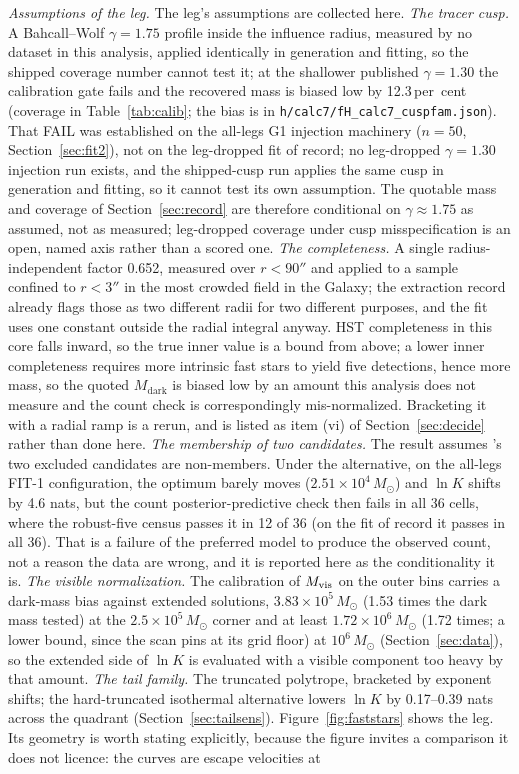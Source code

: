 \documentclass[11pt]{article}
\newcommand{\msun}{\ensuremath{M_\odot}}
\newcommand{\mdark}{\ensuremath{M_{\mathrm{dark}}}}
\newcommand{\lnK}{\ensuremath{\ln K}}
\begin{document}
\emph{Assumptions of the leg.} The leg's assumptions are collected here. \emph{The tracer cusp.} A Bahcall--Wolf $\gamma = 1.75$ profile inside the influence radius, measured by no dataset in this analysis, applied identically in generation and fitting, so the shipped coverage number cannot test it; at the shallower published $\gamma = 1.30$ the calibration gate fails and the recovered mass is biased low by 12.3\,per~cent (coverage in Table~\ref{tab:calib}; the bias is in \texttt{h/calc7/fH\_calc7\_cuspfam.json}). That FAIL was established on the all-legs G1 injection machinery ($n = 50$, Section~\ref{sec:fit2}), not on the leg-dropped fit of record; no leg-dropped $\gamma = 1.30$ injection run exists, and the shipped-cusp run applies the same cusp in generation and fitting, so it cannot test its own assumption. The quotable mass and coverage of Section~\ref{sec:record} are therefore conditional on $\gamma \approx 1.75$ as assumed, not as measured; leg-dropped coverage under cusp misspecification is an open, named axis rather than a scored one. \emph{The completeness.} A single radius-independent factor 0.652, measured over $r < 90''$ and applied to a sample confined to $r < 3''$ in the most crowded field in the Galaxy; the extraction record already flags those as two different radii for two different purposes, and the fit uses one constant outside the radial integral anyway. HST completeness in this core falls inward, so the true inner value is a bound from above; a lower inner completeness requires more intrinsic fast stars to yield five detections, hence more mass, so the quoted \mdark{} is biased low by an amount this analysis does not measure and the count check is correspondingly mis-normalized. Bracketing it with a radial ramp is a rerun, and is listed as item (vi) of Section~\ref{sec:decide} rather than done here. \emph{The membership of two candidates.} The result assumes \citeauthor{Haberle2024Nature}'s two excluded candidates are non-members. Under the alternative, on the all-legs FIT-1 configuration, the optimum barely moves ($2.51\times10^{4}\,\msun$) and $\lnK$ shifts by 4.6 nats, but the count posterior-predictive check then fails in all 36 cells, where the robust-five census passes it in 12 of 36 (on the fit of record it passes in all 36). That is a failure of the preferred model to produce the observed count, not a reason the data are wrong, and it is reported here as the conditionality it is. \emph{The visible normalization.} The calibration of $M_{\rm vis}$ on the outer bins carries a dark-mass bias against extended solutions, $3.83\times10^{5}\,\msun$ (1.53 times the dark mass tested) at the $2.5\times10^{5}\,\msun$ corner and at least $1.72\times10^{6}\,\msun$ (1.72 times; a lower bound, since the scan pins at its grid floor) at $10^{6}\,\msun$ (Section~\ref{sec:data}), so the extended side of $\lnK$ is evaluated with a visible component too heavy by that amount. \emph{The tail family.} The truncated polytrope, bracketed by exponent shifts; the hard-truncated isothermal alternative lowers $\lnK$ by 0.17--0.39 nats across the quadrant (Section~\ref{sec:tailsens}). Figure~\ref{fig:faststars} shows the leg. Its geometry is worth stating explicitly, because the figure invites a comparison it does not licence: the curves are escape velocities at 
\end{document}
